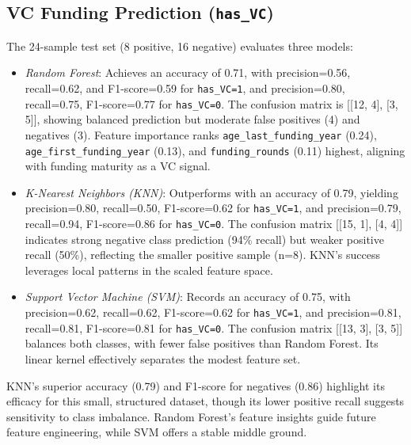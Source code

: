 \documentclass[conference]{IEEEtran}
\begin{document}
    \subsection{VC Funding Prediction (\texttt{has\_VC})}
    The 24-sample test set (8 positive, 16 negative) evaluates three models:
    \begin{itemize}
        \item \textit{Random Forest}: Achieves an accuracy of 0.71, with precision=0.56, recall=0.62, and F1-score=0.59 for \texttt{has\_VC=1}, and precision=0.80, recall=0.75, F1-score=0.77 for \texttt{has\_VC=0}. The confusion matrix is [[12, 4], [3, 5]], showing balanced prediction but moderate false positives (4) and negatives (3). Feature importance ranks \texttt{age\_last\_funding\_year} (0.24), \texttt{age\_first\_funding\_year} (0.13), and \texttt{funding\_rounds} (0.11) highest, aligning with funding maturity as a VC signal.
        \item \textit{K-Nearest Neighbors (KNN)}: Outperforms with an accuracy of 0.79, yielding precision=0.80, recall=0.50, F1-score=0.62 for \texttt{has\_VC=1}, and precision=0.79, recall=0.94, F1-score=0.86 for \texttt{has\_VC=0}. The confusion matrix [[15, 1], [4, 4]] indicates strong negative class prediction (94\% recall) but weaker positive recall (50\%), reflecting the smaller positive sample (n=8). KNN’s success leverages local patterns in the scaled feature space.
        \item \textit{Support Vector Machine (SVM)}: Records an accuracy of 0.75, with precision=0.62, recall=0.62, F1-score=0.62 for \texttt{has\_VC=1}, and precision=0.81, recall=0.81, F1-score=0.81 for \texttt{has\_VC=0}. The confusion matrix [[13, 3], [3, 5]] balances both classes, with fewer false positives than Random Forest. Its linear kernel effectively separates the modest feature set.
    \end{itemize}
    KNN’s superior accuracy (0.79) and F1-score for negatives (0.86) highlight its efficacy for this small, structured dataset, though its lower positive recall suggests sensitivity to class imbalance. Random Forest’s feature insights guide future feature engineering, while SVM offers a stable middle ground.
\end{document}
